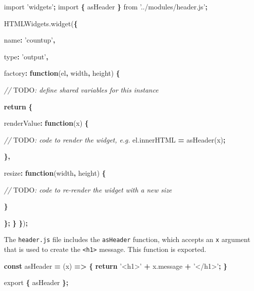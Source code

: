 \documentclass[10pt,]{krantz}
\makeatletter
\newenvironment{Shaded}{\begin{snugshade}}{\end{snugshade}}
\newcommand{\AlertTok}[1]{\textcolor[rgb]{0.33,0.33,0.33}{#1}}
\newcommand{\AttributeTok}[1]{\textcolor[rgb]{0.61,0.61,0.61}{#1}}
\newcommand{\CommentTok}[1]{\textcolor[rgb]{0.37,0.37,0.37}{\textit{#1}}}
\newcommand{\ControlFlowTok}[1]{\textcolor[rgb]{0.27,0.27,0.27}{\textbf{#1}}}
\newcommand{\DataTypeTok}[1]{\textcolor[rgb]{0.27,0.27,0.27}{#1}}
\newcommand{\ImportTok}[1]{#1}
\newcommand{\KeywordTok}[1]{\textcolor[rgb]{0.27,0.27,0.27}{\textbf{#1}}}
\newcommand{\NormalTok}[1]{#1}
\newcommand{\OperatorTok}[1]{\textcolor[rgb]{0.43,0.43,0.43}{\textbf{#1}}}
\newcommand{\StringTok}[1]{\textcolor[rgb]{0.5,0.5,0.5}{#1}}
\newcommand{\VariableTok}[1]{\textcolor[rgb]{0,0,0}{#1}}
\newenvironment{kframe}{%
\medskip{}
\setlength{\fboxsep}{.8em}
 \def\at@end@of@kframe{}%
 \ifinner\ifhmode%
  \def\at@end@of@kframe{\end{minipage}}%
  \begin{minipage}{\columnwidth}%
 \fi\fi%
 \def\FrameCommand##1{\hskip\@totalleftmargin \hskip-\fboxsep
 \colorbox{shadecolor}{##1}\hskip-\fboxsep
     \hskip-\linewidth \hskip-\@totalleftmargin \hskip\columnwidth}%
 \MakeFramed {\advance\hsize-\width
   \@totalleftmargin\z@ \linewidth\hsize
   \@setminipage}}%
 {\par\unskip\endMakeFramed%
 \at@end@of@kframe}
\renewenvironment{Shaded}{\begin{kframe}}{\end{kframe}}
\makeatother
\begin{document}
\begin{Shaded}
\begin{Highlighting}[]
\ImportTok{import} \StringTok{'widgets'}\OperatorTok{;}
\ImportTok{import} \OperatorTok{\{}\NormalTok{ asHeader }\OperatorTok{\}} \ImportTok{from} \StringTok{'../modules/header.js'}\OperatorTok{;} 

\VariableTok{HTMLWidgets}\NormalTok{.}\AttributeTok{widget}\NormalTok{(}\OperatorTok{\{}

  \DataTypeTok{name}\OperatorTok{:} \StringTok{'countup'}\OperatorTok{,}

  \DataTypeTok{type}\OperatorTok{:} \StringTok{'output'}\OperatorTok{,}

  \DataTypeTok{factory}\OperatorTok{:} \KeywordTok{function}\NormalTok{(el}\OperatorTok{,}\NormalTok{ width}\OperatorTok{,}\NormalTok{ height) }\OperatorTok{\{}

    \CommentTok{// }\AlertTok{TODO}\CommentTok{: define shared variables for this instance}

    \ControlFlowTok{return} \OperatorTok{\{}

      \DataTypeTok{renderValue}\OperatorTok{:} \KeywordTok{function}\NormalTok{(x) }\OperatorTok{\{}

        \CommentTok{// }\AlertTok{TODO}\CommentTok{: code to render the widget, e.g.}
        \VariableTok{el}\NormalTok{.}\AttributeTok{innerHTML} \OperatorTok{=} \AttributeTok{asHeader}\NormalTok{(x)}\OperatorTok{;}

      \OperatorTok{\},}

      \DataTypeTok{resize}\OperatorTok{:} \KeywordTok{function}\NormalTok{(width}\OperatorTok{,}\NormalTok{ height) }\OperatorTok{\{}

        \CommentTok{// }\AlertTok{TODO}\CommentTok{: code to re-render the widget with a new size}

      \OperatorTok{\}}

    \OperatorTok{\};}
  \OperatorTok{\}}
\OperatorTok{\}}\NormalTok{)}\OperatorTok{;}
\end{Highlighting}
\end{Shaded}

The \texttt{header.js} file includes the \texttt{asHeader} function, which accepts an \texttt{x} argument that is used to create the \texttt{\textless{}h1\textgreater{}} message. This function is exported.

\begin{Shaded}
\begin{Highlighting}[]
\KeywordTok{const}\NormalTok{ asHeader }\OperatorTok{=}\NormalTok{ (x) }\KeywordTok{=>} \OperatorTok{\{}
  \ControlFlowTok{return} \StringTok{'<h1>'} \OperatorTok{+} \VariableTok{x}\NormalTok{.}\AttributeTok{message} \OperatorTok{+} \StringTok{'</h1>'}\OperatorTok{;}
\OperatorTok{\}}

\ImportTok{export} \OperatorTok{\{}\NormalTok{ asHeader }\OperatorTok{\};}
\end{Highlighting}
\end{Shaded}
\end{document}

